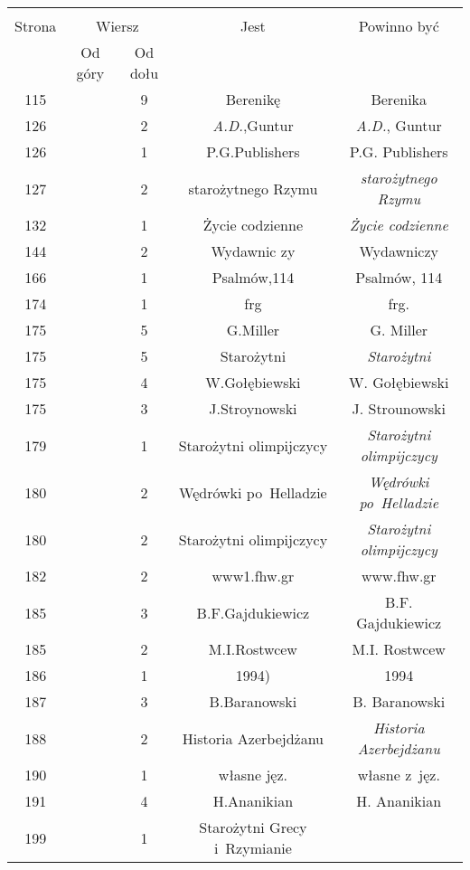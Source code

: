 \documentclass[a4paper,11pt]{article}
\begin{document}
\begin{center}
  \begin{tabular}{|c|c|c|c|c|}
    \hline
    & \multicolumn{2}{c|}{} & & \\
    Strona & \multicolumn{2}{c|}{Wiersz} & Jest
                              & Powinno być \\ \cline{2-3}
    & Od góry & Od dołu & & \\
    \hline
    115 & &  9 & Berenikę & Berenika \\
    126 & &  2 & \emph{A.D.},Guntur & \emph{A.D.}, Guntur \\
    126 & &  1 & P.G.Publishers & P.G. Publishers \\
    127 & &  2 & starożytnego Rzymu & \emph{starożytnego Rzymu} \\
    132 & &  1 & Życie codzienne & \emph{Życie codzienne} \\
    144 & &  2 & Wydawnic zy & Wydawniczy \\
    166 & &  1 & Psalmów,114 & Psalmów, 114 \\
    174 & &  1 & frg & frg. \\
    175 & &  5 & G.Miller & G. Miller \\
    175 & &  5 & Starożytni & \emph{Starożytni} \\
    175 & &  4 & W.Gołębiewski & W. Gołębiewski \\
    175 & &  3 & J.Stroynowski & J. Strounowski \\
    179 & &  1 & Starożytni olimpijczycy
           & \emph{Starożytni olimpijczycy} \\
    180 & &  2 & Wędrówki po~Helladzie & \emph{Wędrówki po~Helladzie} \\
    180 & &  2 & Starożytni olimpijczycy
           & \emph{Starożytni olimpijczycy} \\
    182 & &  2 & www1.fhw.gr & www.fhw.gr \\
    185 & &  3 & B.F.Gajdukiewicz & B.F. Gajdukiewicz \\
    185 & &  2 & M.I.Rostwcew & M.I. Rostwcew \\
    186 & &  1 & 1994) & 1994 \\
    187 & &  3 & B.Baranowski & B. Baranowski \\
    188 & &  2 & Historia Azerbejdżanu & \emph{Historia Azerbejdżanu} \\
    190 & &  1 & własne jęz. & własne z~jęz. \\
    191 & &  4 & H.Ananikian & H. Ananikian \\
    199 & &  1 & Starożytni Grecy i~Rzymianie

\end{tabular}
\end{center}
\end{document}

